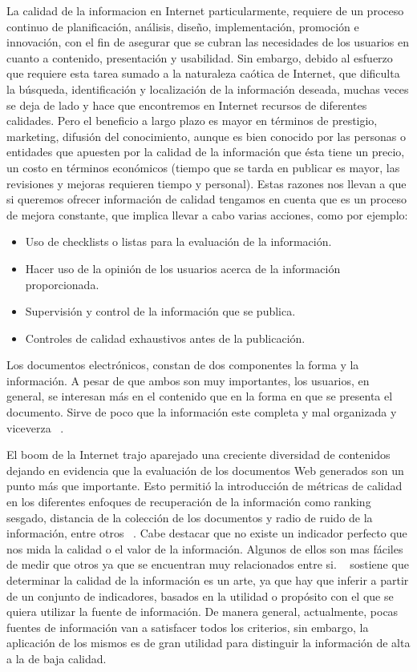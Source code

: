 La calidad de la informacion en Internet particularmente, requiere de un proceso continuo de planificaci\'on, an\'alisis, dise\~no, implementaci\'on, promoci\'on e innovaci\'on, con el fin de asegurar que se cubran las necesidades de los usuarios en cuanto a contenido, presentaci\'on y usabilidad. Sin embargo, debido al esfuerzo que requiere esta tarea sumado a la naturaleza ca\'otica de Internet, que dificulta la b\'usqueda, identificaci\'on y localizaci\'on de la informaci\'on deseada, muchas veces se deja de lado y hace que encontremos en Internet recursos de diferentes calidades. Pero el beneficio a largo plazo es mayor en t\'erminos de prestigio, marketing, difusi\'on del conocimiento, aunque es bien conocido por las personas o entidades que apuesten por la calidad de la informaci\'on que \'esta tiene un precio, un costo en t\'erminos econ\'omicos (tiempo que se tarda en publicar es mayor, las revisiones y mejoras requieren tiempo y personal).
Estas razones nos llevan a que si queremos ofrecer informaci\'on de calidad tengamos en cuenta que es un proceso de mejora constante, que implica llevar a cabo varias acciones, como por ejemplo:

\begin{itemize}
\item Uso de checklists o listas para la evaluaci\'on de la informaci\'on.
\item Hacer uso de la opini\'on de los usuarios acerca de la informaci\'on proporcionada.
\item Supervisi\'on y control de la informaci\'on que se publica.
\item Controles de calidad exhaustivos antes de la publicaci\'on.
\end{itemize}

Los documentos electr\'onicos, constan de dos componentes la forma y la informaci\'on. A pesar de que ambos son muy importantes, los usuarios, en general, se interesan m\'as en el contenido que en la forma en que se presenta el documento. Sirve de poco que la informaci\'on este completa y mal organizada y viceverza ~\cite{MaPiMo:11}.

El boom de la Internet trajo aparejado una creciente diversidad de contenidos dejando en evidencia que la evaluaci\'on de los documentos Web generados son un punto m\'as que importante. Esto permiti\'o la introducci\'on de m\'etricas  de calidad en los diferentes enfoques de recuperaci\'on de la informaci\'on como ranking sesgado, distancia de la colecci\'on de los documentos y radio de ruido de la informaci\'on, entre otros ~\cite{BenCroDia:11, PirTal:10, ZhoCro:05, ZhuGau:00}. Cabe destacar que no existe un indicador perfecto que nos mida la calidad o el valor de la informaci\'on. Algunos de ellos son mas f\'aciles de medir que otros ya que se encuentran muy relacionados entre si. ~\cite{Harrr:97} sostiene que determinar la calidad de la informaci\'on es un arte, ya que hay que inferir a partir de un conjunto de indicadores, basados en la utilidad o prop\'osito con el que se quiera utilizar la fuente de informaci\'on. De manera general, actualmente, pocas fuentes de informaci\'on van a satisfacer todos los criterios, sin embargo, la aplicaci\'on de los mismos es de gran utilidad para distinguir la informaci\'on de alta a la de baja calidad.

